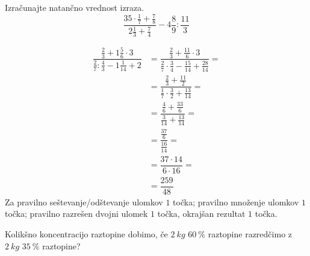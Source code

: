 \documentclass[addpoints]{exam}
\begin{document}
\begin{questions}

    

    \question[4]
    Izračunajte natančno vrednost izraza.
        $$\dfrac{35\cdot \frac{1}{7}+\frac{7}{8}}{2\frac{1}{3}+\frac{7}{4}}-4\frac{8}{9}:\frac{11}{3}$$

        \begin{solution}[9cm]
            \begin{align*} 
                \dfrac{\frac{2}{3}+1\frac{5}{6}\cdot 3}{\frac{2}{7}:\frac{4}{3}-1\frac{1}{14}+2}&=\dfrac{\frac{2}{3}+\frac{11}{6}\cdot 3}{\frac{2}{7}\cdot\frac{3}{4}-\frac{15}{14}+\frac{28}{14}}= \\
                                                                                                &=\dfrac{\frac{2}{3}+\frac{11}{2}}{\frac{1}{7}\cdot\frac{3}{2}+\frac{13}{14}}= \\
                                                                                                &=\dfrac{\frac{4}{6}+\frac{33}{6}}{\frac{3}{14}+\frac{13}{14}}= \\
                                                                                                &=\dfrac{\frac{37}{6}}{\frac{16}{14}}= \\
                                                                                                &=\dfrac{37\cdot 14}{6\cdot 16}= \\
                                                                                                &=\dfrac{259}{48} 
            \end{align*}
            Za pravilno seštevanje/odštevanje ulomkov $1$ točka; pravilno množenje ulomkov $1$ točka; pravilno razrešen dvojni ulomek $1$ točka, okrajšan rezultat $1$ točka.
        \end{solution}




        \question[4]
        Kolikšno koncentracijo raztopine dobimo, če $2~kg$ $60~\%$ raztopine razredčimo z $2~kg$ $35~\%$ raztopine?


\end{questions}
\end{document}
